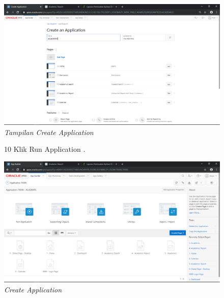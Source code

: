 \begin{enumerate}
\begin{figure}
    \begin{center}
\includegraphics[scale=0.2]{figures/9.png}
    \caption{\textit{Tampilan Create Application}}
        \end{center}
\label{gambar}
\end{figure}

\begin{figure}
\item[10] Klik Run Application .

    \begin{center}
\includegraphics[scale=0.2]{figures/10.png}
    \caption{\textit{Create Application}}
        \end{center}
\label{gambar}
\end{figure}


\end{enumerate}

